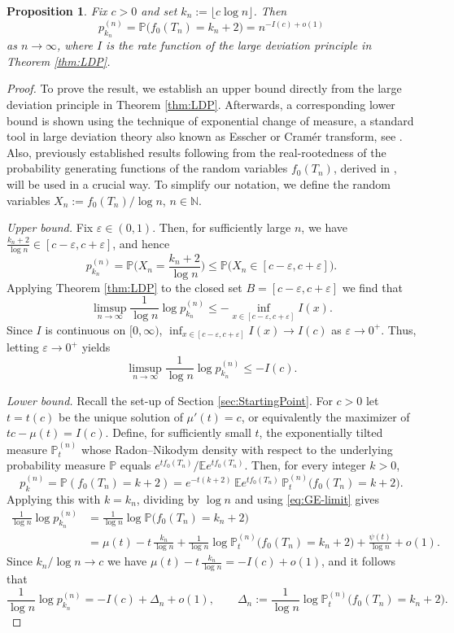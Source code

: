 \documentclass[11pt,a4paper]{article}
\numberwithin{equation}{section}
\newtheorem {proposition}[theorem]{Proposition}
\def\EE{\mathbb{E}}
\def\NN{\mathbb{N}}
\def\PP{\mathbb{P}}
\begin{document}
\begin{proposition}
	Fix \(c>0\) and set \(k_n:=\lfloor c\log n\rfloor\). Then
	\[
	p_{k_n}^{(n)}=\PP\big(f_0(T_n)=k_n+2\big)=n^{-I(c)+o(1)}
	\]
	as $n\to\infty$, where $I$ is the rate function of the large deviation principle in Theorem \ref{thm:LDP}.
\end{proposition}
\begin{proof}
	To prove the result, we establish an upper bound directly from the large deviation principle in Theorem \ref{thm:LDP}. Afterwards, a corresponding lower bound is shown using the technique of exponential change of measure, a standard tool in large deviation theory also known as Esscher or Cram\'er transform, see \cite{DZlargeDeviations}. Also, previously established results following from the real-rootedness of the probability generating functions of the random variables $f_0(T_n)$, derived in \cite{GT:2021}, will be used in a crucial way. To simplify our notation, we define the random variables $X_n:=f_0(T_n)/\log n$, $n\in\NN$.
	
	\medspace
	
	\textit{Upper bound.}
	Fix \(\varepsilon\in(0,1)\). Then, for sufficiently large \(n\), we have $\frac{k_n+2}{\log n}\in[c-\varepsilon,c+\varepsilon]$, and hence
	\[
	p_{k_n}^{(n)}=\PP\Big(X_n=\frac{k_n+2}{\log n}\Big)
	\le \PP\big(X_n\in[c-\varepsilon,c+\varepsilon]\big).
	\]
	Applying Theorem \ref{thm:LDP} to the closed set $B=[c-\varepsilon,c+\varepsilon]$ we find that
	\[
	\limsup_{n\to\infty}\frac{1}{\log n}\log p_{k_n}^{(n)}
	\le -\inf_{x\in[c-\varepsilon,c+\varepsilon]} I(x).
	\]
	Since \(I\) is continuous on \([0,\infty)\),
	\(\inf_{x\in[c-\varepsilon,c+\varepsilon]} I(x)\to I(c)\) as \(\varepsilon\to 0^+\). Thus, letting \(\varepsilon\to 0^+\) yields
	\[
	\limsup_{n\to\infty}\frac{1}{\log n}\log p_{k_n}^{(n)}\le -I(c).
	\]
	
	\medskip
	\textit{Lower bound.}
	Recall the set-up of Section \ref{sec:StartingPoint}. For $c>0$ let $t=t(c)$ be the unique solution of $\mu'(t)=c$, or equivalently the maximizer of $tc-\mu(t)=I(c)$. Define, for sufficiently small $t$, the exponentially tilted measure $\PP_t^{(n)}$ whose Radon--Nikodym density with respect to the underlying probability measure $\PP$ equals $e^{t f_0(T_n)}/\EE e^{t f_0(T_n)}$.
	Then, for every integer $k> 0$,
	$$
		p_k^{(n)}=\PP(f_0(T_n)=k+2)
		=e^{-t (k+2)}\,\EE e^{t f_0(T_n)}\,\PP_t^{(n)}\big(f_0(T_n)=k+2\big).
	$$
	Applying this with $k=k_n$, dividing by $\log n$ and using \eqref{eq:GE-limit} gives
	\begin{align*}
		\frac{1}{\log n}\log p_{k_n}^{(n)}
		&=\frac{1}{\log n}\log \PP\big(f_0(T_n)=k_n+2\big)\\
		&=\mu(t)-t\,\frac{k_n}{\log n}
		+\frac{1}{\log n}\log \PP_t^{(n)}\big(f_0(T_n)=k_n+2\big)
		+\frac{\psi(t)}{\log n}+o(1).
	\end{align*}
	Since $k_n/\log n\to c$ we have $\mu(t)-t\,\tfrac{k_n}{\log n}=-I(c)+o(1)$, and it follows that
	\begin{equation}\label{eq:LB-main}
		\frac{1}{\log n}\log p_{k_n}^{(n)} = -I(c)+\Delta_n+o(1),
		\qquad
		\Delta_n:=\frac{1}{\log n}\log \PP_t^{(n)}\big(f_0(T_n)=k_n+2\big).
	\end{equation}
	

\end{proof}
\end{document}
